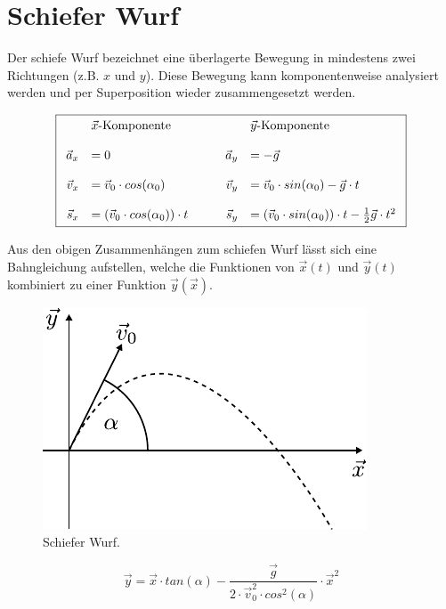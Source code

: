 \section{Schiefer Wurf}
Der schiefe Wurf bezeichnet eine überlagerte Bewegung in mindestens zwei
Richtungen (z.B. $x$ und $y$). Diese Bewegung kann komponentenweise 
analysiert werden und per Superposition wieder zusammengesetzt werden.

\[\boxed{\begin{array}{r l  r l}
	& \vec{x}\text{-Komponente} & & \vec{y}\text{-Komponente} \\
	& & & \\
	\vec{a}_x 
		& = 0 
		& \qquad \vec{a}_y 
		& = -\vec{g} \\
	 & & &  \\
	\vec{v}_x 
		& = \vec{v}_0 \cdot cos(\alpha_0)
		& \vec{v}_y
		& = \vec{v}_0 \cdot sin(\alpha_0) -\vec{g} \cdot t \\
	 & & & \\
	\vec{s}_x
		& = \left( \vec{v}_0 \cdot cos(\alpha_0) \right) \cdot t
		& \vec{s}_y
		& = \left( \vec{v}_0 \cdot sin(\alpha_0) \right) \cdot t 
			- \frac{1}{2}\vec{g} \cdot t^2
\end{array}}\]

\noindent
Aus den obigen Zusammenhängen zum schiefen Wurf lässt sich eine 
Bahngleichung aufstellen, welche die Funktionen von $\vec{x}(t)$ und
$\vec{y}(t)$ kombiniert zu einer Funktion $\vec{y}(\vec{x})$.

\begin{figure}[h!]
	\centering
	\includegraphics[scale=0.8]{wurf.pdf}
	\caption{Schiefer Wurf.}
	\label{fig:wurf}
\end{figure}

\[ \boxed{
	\vec{y} = \vec{x} \cdot tan(\alpha) 
		- \frac{\vec{g}}{2 \cdot \vec{v}_0^2 \cdot cos^2(\alpha)}
		\cdot \vec{x}^2
} \]

